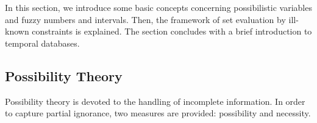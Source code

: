 In this section, we introduce some basic concepts concerning possibilistic variables and fuzzy numbers and intervals. Then, the framework of set evaluation by ill-known constraints \cite{Pons2011} is explained. The section concludes with a brief introduction to temporal databases.


% 

\subsection{\label{subsec:possibility-theory}Possibility Theory}
Possibility theory is devoted to the handling of incomplete information. In order to capture partial ignorance, two measures are provided: possibility and necessity.

